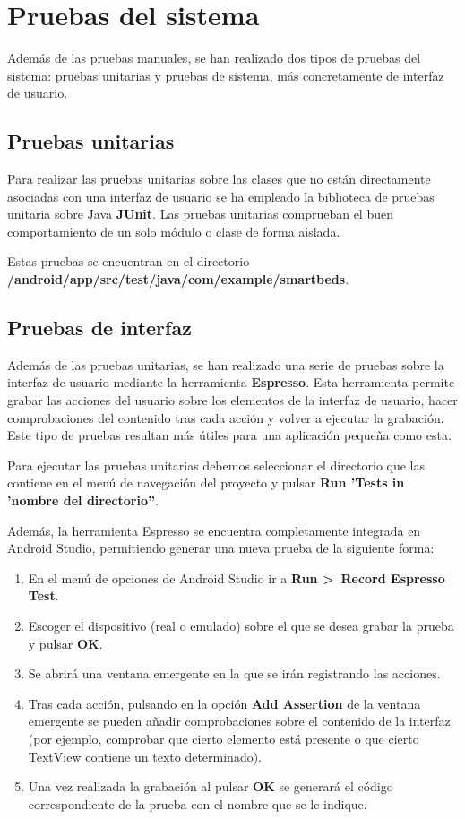 \section{Pruebas del sistema}

Además de las pruebas manuales, se han realizado dos tipos de pruebas del sistema: pruebas unitarias y pruebas de sistema, más concretamente de interfaz de usuario. 

\subsection{Pruebas unitarias} 

Para realizar las pruebas unitarias sobre las clases que no están directamente asociadas con una interfaz de usuario se ha empleado la biblioteca de pruebas unitaria sobre Java \textbf{JUnit}. Las pruebas unitarias comprueban el buen comportamiento de un solo módulo o clase de forma aislada.

Estas pruebas se encuentran en el directorio \\ \textbf{/android/app/src/test/java/com/example/smartbeds}. 

\subsection{Pruebas de interfaz}

Además de las pruebas unitarias, se han realizado una serie de pruebas sobre la interfaz de usuario mediante la herramienta \textbf{Espresso}. Esta herramienta permite grabar las acciones del usuario sobre los elementos de la interfaz de usuario, hacer comprobaciones del contenido tras cada acción y volver a ejecutar la grabación. Este tipo de pruebas resultan más útiles para una aplicación pequeña como esta. 

Para ejecutar las pruebas unitarias debemos seleccionar el directorio que las contiene en el menú de navegación del proyecto y pulsar \textbf{Run 'Tests in 'nombre del directorio''}. 

Además, la herramienta Espresso se encuentra completamente integrada en Android Studio, permitiendo generar una nueva prueba de la siguiente forma:

\begin{enumerate}
	\item En el menú de opciones de Android Studio ir a \textbf{Run >~Record Espresso Test}. 
	\item Escoger el dispositivo (real o emulado) sobre el que se desea grabar la prueba y pulsar \textbf{OK}. 
	\item Se abrirá una ventana emergente en la que se irán registrando las acciones. 
	\item Tras cada acción, pulsando en la opción \textbf{Add Assertion} de la ventana emergente se pueden añadir comprobaciones sobre el contenido de la interfaz (por ejemplo, comprobar que cierto elemento está presente o que cierto TextView contiene un texto determinado). 
	\item Una vez realizada la grabación al pulsar \textbf{OK} se generará el código correspondiente de la prueba con el nombre que se le indique. 
\end{enumerate} 

